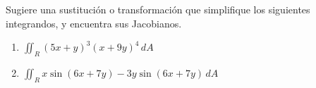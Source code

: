  Sugiere una sustitución o transformación que simplifique los siguientes integrandos, y encuentra sus Jacobianos.

\begin{enumerate}[label=(\alph*), itemsep=0.4em, topsep=0.5em]
    \item $\displaystyle \iint_R (5x + y)^3 (x + 9y)^4 \, dA$
    \item $\displaystyle \iint_R x \sin(6x + 7y) - 3y \sin(6x + 7y) \, dA$
\end{enumerate}
